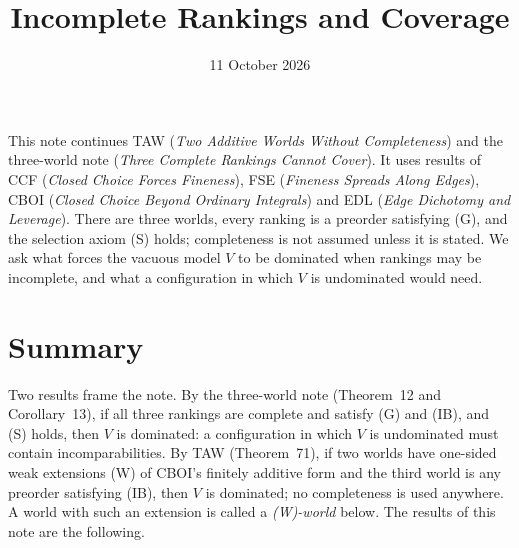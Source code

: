 \documentclass[11pt]{article}
\title{Incomplete Rankings and Coverage}
\author{}\date{11 October 2026}
\theoremstyle{definition}\newtheorem{definition}[theorem]{Definition}
\theoremstyle{remark}\newtheorem{remark}[theorem]{Remark}
\begin{document}
\maketitle

\noindent
This note continues TAW (\emph{Two Additive Worlds Without Completeness})
and the three-world note (\emph{Three Complete Rankings Cannot Cover}). It
uses results of CCF (\emph{Closed Choice Forces Fineness}), FSE
(\emph{Fineness Spreads Along Edges}), CBOI (\emph{Closed Choice Beyond
Ordinary Integrals}) and EDL (\emph{Edge Dichotomy and Leverage}). There are three worlds, every
ranking is a preorder satisfying (G), and the selection axiom (S) holds;
completeness is not assumed unless it is stated. We ask what forces the
vacuous model $V$ to be dominated when rankings may be incomplete, and what
a configuration in which $V$ is undominated would need.

\section{Summary}\label{sec:summary}

Two results frame the note. By the three-world note (Theorem~12 and
Corollary~13), if all three rankings are complete and satisfy (G) and (IB),
and (S) holds, then $V$ is dominated: a configuration in which $V$ is
undominated must contain incomparabilities. By TAW (Theorem~71), if two
worlds have one-sided weak extensions (W) of CBOI's finitely additive form
and the third world is any preorder satisfying (IB), then $V$ is dominated;
no completeness is used anywhere. A world with such an extension is called a
\emph{(W)-world} below. The results of this note are the following.
\end{document}
